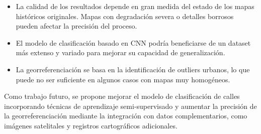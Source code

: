 \documentclass[twocolumn, fontsize=10pt]{article}
\begin{document}
\begin{itemize}
    \item La calidad de los resultados depende en gran medida del estado de los mapas hist\'oricos originales. Mapas con degradaci\'on severa o detalles borrosos pueden afectar la precisi\'on del proceso.
    \item El modelo de clasificaci\'on basado en CNN podr\'ia beneficiarse de un dataset m\'as extenso y variado para mejorar su capacidad de generalizaci\'on.
    \item La georreferenciaci\'on se basa en la identificaci\'on de outliers urbanos, lo que puede no ser suficiente en algunos casos con mapas muy homog\'eneos.
\end{itemize}

Como trabajo futuro, se propone mejorar el modelo de clasificaci\'on de calles incorporando t\'ecnicas de aprendizaje semi-supervisado y aumentar la precisi\'on de la georreferenciaci\'on mediante la integraci\'on con datos complementarios, como im\'agenes satelitales y registros cartogr\'aficos adicionales.




\renewcommand\refname{Referencias}
\end{document}
